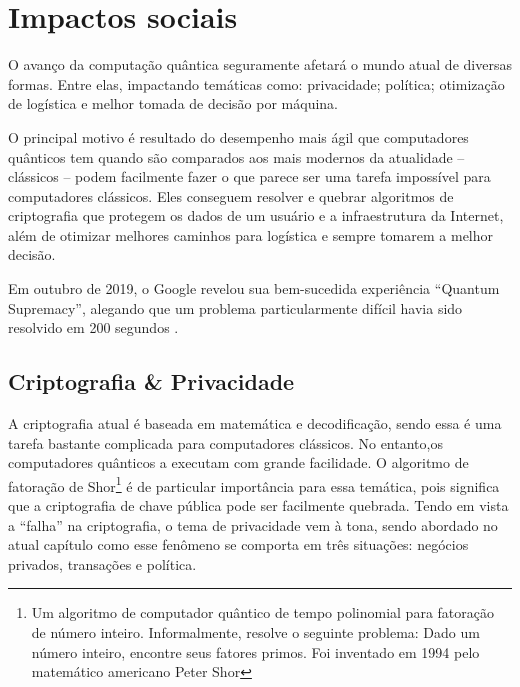 \section{Impactos sociais}
\label{social_impacts}
O avanço da computação quântica seguramente afetará o mundo atual de diversas formas. Entre elas, impactando temáticas como: privacidade; política; otimização de logística e melhor tomada de decisão por máquina.

O principal motivo é resultado do desempenho mais ágil que computadores quânticos tem quando são comparados aos mais modernos da atualidade – clássicos – podem facilmente fazer o que parece ser uma tarefa impossível para computadores clássicos. Eles conseguem resolver e quebrar algoritmos de criptografia que protegem os dados de um usuário e a infraestrutura da Internet, além de otimizar melhores caminhos para logística e sempre tomarem a melhor decisão.

Em outubro de 2019, o Google revelou sua bem-sucedida experiência “Quantum Supremacy”, alegando que um problema particularmente difícil havia sido resolvido em 200 segundos 
 \cite{15}.

\subsection{Criptografia \& Privacidade}
A criptografia atual é baseada em matemática e decodificação, sendo essa é uma tarefa bastante complicada para computadores clássicos. No entanto,os computadores quânticos a executam com grande facilidade. O algoritmo de fatoração de Shor\footnote{Um algoritmo de computador quântico de tempo polinomial para fatoração de número inteiro. Informalmente, resolve o seguinte problema: Dado um número inteiro, encontre seus fatores primos. Foi inventado em 1994 pelo matemático americano Peter Shor} é de particular importância para essa temática, pois significa que a criptografia de chave pública pode ser facilmente quebrada. Tendo em vista a “falha” na criptografia, o tema de privacidade vem à tona, sendo abordado no atual capítulo como esse fenômeno se comporta em três situações: negócios privados, transações e política.


